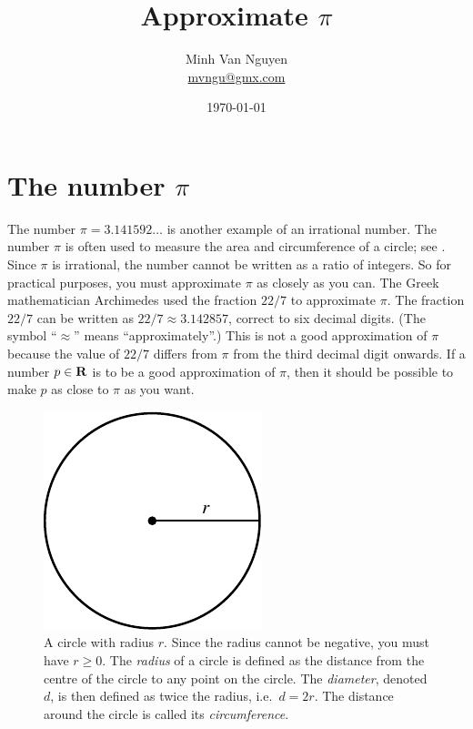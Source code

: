 \documentclass[a4paper,oneside,12pt]{article}
\begin{document}
\title{\Large\bf Approximate $\pi$}
\author{%
  Minh Van Nguyen \\
  \url{mvngu@gmx.com}
}
\date{\today}
\maketitle



\section{The number $\pi$}

The number $\pi = 3.141592\dots$ is another example of an irrational
number.  The number $\pi$ is often used to measure the area and
circumference of a circle; see .  Since
$\pi$ is irrational, the number cannot be written as a ratio of
integers.  So for practical purposes, you must approximate $\pi$ as
closely as you can.  The Greek mathematician Archimedes used the
fraction $22 / 7$ to approximate $\pi$.  The fraction $22 / 7$ can be
written as $22 / 7 \approx 3.142857$, correct to six decimal digits.
(The symbol ``$\approx$'' means ``approximately''.)  This is not a
good approximation of $\pi$ because the value of $22 / 7$ differs from
$\pi$ from the third decimal digit onwards.  If a number $p \in \mathbf{R}$
is to be a good approximation of $\pi$, then it should be possible to
make $p$ as close to $\pi$ as you want.

\begin{figure}[!htbp]
\centering
\includegraphics[scale=1]{image/05/circle.pdf}
\caption{%
  A circle with radius $r$.  Since the radius cannot be negative, you
  must have $r \geq 0$.  The \emph{radius} of a circle is defined as
  the distance from the centre of the circle to any point on the
  circle.  The \emph{diameter}, denoted $d$, is then defined as twice
  the radius, i.e.~$d = 2r$.  The distance around the circle is called
  its \emph{circumference}.
}
\label{fig:general_circle}
\end{figure}
\end{document}
